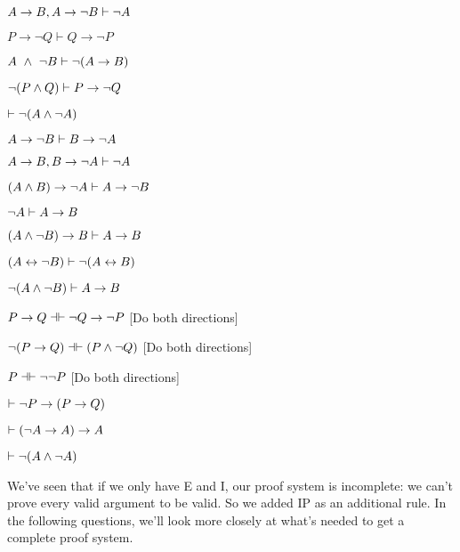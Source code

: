 \begin{earg}
\item $A\rightarrow B, A \rightarrow \neg B \vdash \neg A$
\item $P \rightarrow \lnot Q \vdash Q \rightarrow \lnot P$
\item $A \ \wedge  \ \neg B \vdash \neg (A \rightarrow B)$ %
\item $\neg (P\wedge  Q) \vdash P\rightarrow \neg Q$
\item $ \vdash \neg (A\wedge  \neg A)$
\item $A \rightarrow \neg B \vdash B \rightarrow \neg A$
\item $A \rightarrow B, B \rightarrow \neg A \vdash \neg A$
\item $(A \wedge B) \rightarrow \neg A \vdash A \rightarrow \neg B$
\item $\neg A \vdash A \rightarrow B$
\item $(A \wedge \neg B) \rightarrow B \vdash A \rightarrow B$
\item $(A\leftrightarrow \neg B) \vdash \neg (A\leftrightarrow B)$
\item $\neg (A\wedge \neg B) \vdash A \rightarrow B$
\item $P \eif Q \pequiv \enot Q \eif \enot P$ \hfill [Do both directions]
\item $\enot (P \eif Q) \pequiv (P \eand \enot Q)$ \hfill [Do both directions]
\item $P \pequiv \enot \enot P$ \hfill [Do both directions]
\item $\vdash \neg P \rightarrow( P \rightarrow Q)$
\item $\vdash (\neg A \rightarrow A) \rightarrow A$
\item $\vdash \neg (A \wedge \neg A)$

\end{earg}

\problempart\label{ex-neg-prf}We've seen that if we only have \enot E and \enot I, our proof system is incomplete: we can't prove every valid argument to be valid. So we added IP as an additional rule.  In the following questions, we'll look more closely at what's needed to get a complete proof system.


